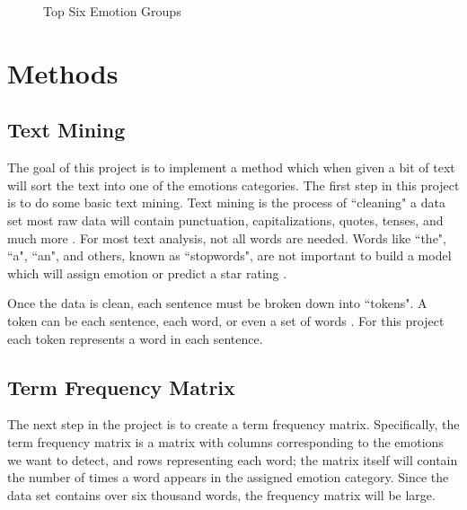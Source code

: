 \documentclass[titlepage,letterpaper]{article}
\begin{document}
 

 \begin{figure}[htb]
		\centering
 		\caption{Top Six Emotion Groups}
 		
 		\label{topsixgroups}
 \end{figure}
 	
 
\section{Methods}

\subsection{Text Mining}
The goal of this project is to implement a method which when given a bit of text will sort the text into one of the emotions categories. The first step in this project is to do some basic text mining. Text mining is the process of ``cleaning" a data set most raw data will contain punctuation, capitalizations, quotes, tenses, and much more \cite{TextMining}. For most text analysis, not all words are needed. Words like ``the", ``a", ``an", and others, known as ``stopwords", are not important to build a model which will assign emotion or predict a star rating \cite{TextMining}. 

Once the data is clean, each sentence must be broken down into ``tokens". A token can be each sentence, each word, or even a set of words \cite{TextMining}. For this project each token represents a word in each sentence. 

\subsection{Term Frequency Matrix}
The next step in the project is to create a term frequency matrix. Specifically, the term frequency matrix is a matrix with columns corresponding to the emotions we want to detect, and rows representing each word; the matrix itself will contain the number of times a word appears in the assigned emotion category. Since the data set contains over six thousand words, the frequency matrix will be large.
\end{document}
